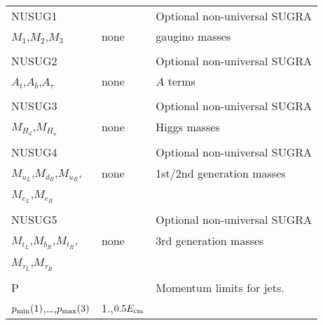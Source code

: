 \newpage
\begin{center}
\begin{tabular}{lll}
\hline\hline
NUSUG1                 &                   & Optional non-universal SUGRA   \\
$M_1$,$M_2$,$M_3$      & none              & gaugino masses                 \\
                       &                   &                                \\
NUSUG2                 &                   & Optional non-universal SUGRA   \\
$A_t$,$A_b$,$A_\tau$   & none              & $A$ terms                      \\
                       &                   &                                \\
NUSUG3                 &                   & Optional non-universal SUGRA   \\
$M_{H_d}$,$M_{H_u}$    & none              & Higgs masses                   \\
                       &                   &                                \\
NUSUG4                 &                   & Optional non-universal SUGRA   \\
$M_{u_L}$,$M_{d_R}$,$M_{u_R}$, & none      & 1st/2nd generation masses      \\
$M_{e_L}$,$M_{e_R}$    &                   &                                \\
                       &                   &                                \\
NUSUG5                 &                   & Optional non-universal SUGRA   \\
$M_{t_L}$,$M_{b_R}$,$M_{t_R}$, & none      & 3rd generation masses          \\
$M_{\tau_L}$,$M_{\tau_R}$ &                &                                \\
                       &                   &                                \\
P                      &                   & Momentum limits for jets.      \\
$p_{\rm min}(1)$,\dots,$p_{\rm max}(3)$ & 
1.,$0.5E_{\rm cm}$                         &                                \\


\end{tabular}
\end{center}

